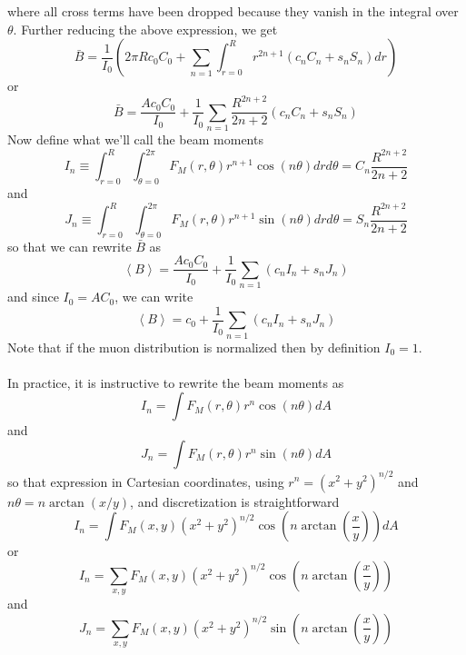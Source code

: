 \documentclass[twoside]{article}
\begin{document}
where all cross terms have been dropped because they vanish in the integral over $\theta$. Further reducing the above expression, we get 
\begin{equation}
\bar{B} = \frac{1}{I_0}(2 \pi R c_0C_0 + \sum_{n=1} \int^R_{r=0} r^{2n + 1}(c_nC_n + s_n S_n ) dr  ) 
\end{equation}
or 
\begin{equation}
\bar{B} = 
\frac{A c_0 C_0}{I_0} + \frac{1}{I_0}\sum_{n=1} \frac{R^{2n + 2}}{2n+2}(c_nC_n + s_n S_n ) 
\end{equation}
Now define what we'll call the beam moments
\begin{equation}
\boxed{
	I_n \equiv \int^{R}_{r = 0}  \int^{2\pi}_{\theta = 0} F_M(r,\theta) r^{n+1} \cos(n\theta) dr d\theta = C_n\frac{R^{2n+2}}{2n + 2}
}
\end{equation}
and
\begin{equation}
\boxed{
	J_n \equiv \int^{R}_{r = 0}  \int^{2\pi}_{\theta = 0} F_M(r,\theta) r^{n+1} \sin(n\theta) dr d\theta = S_n\frac{R^{2n+2}}{2n + 2}
}
\end{equation}
so that we can rewrite $\bar{B}$ as
\begin{equation}
\left\langle B \right\rangle = 
\frac{A c_0 C_0}{I_0} + \frac{1}{I_0}\sum_{n=1}(c_n I_n + s_n J_n ) 
\end{equation}
and since $I_0 = A C_0$, we can write
\begin{equation}
\boxed{
\left\langle B \right\rangle = 
c_0 + \frac{1}{I_0}\sum_{n=1}(c_n I_n + s_n J_n ) 
}
\end{equation}
Note that if the muon distribution is normalized then by definition $I_0 = 1$. \\
\\
In practice, it is instructive to rewrite the beam moments as
\begin{equation}
	I_n = \int F_M(r,\theta) r^{n} \cos(n\theta) dA 
	\end{equation}
and
\begin{equation}
J_n = \int F_M(r,\theta) r^{n} \sin(n\theta) dA 
\end{equation}
so that expression in Cartesian coordinates, using $r^n=(x^2 + y^2)^{n/2}$ and $n \theta = n \arctan(x/y)$, and discretization is straightforward
\begin{equation}
I_n =  \int F_M(x,y) (x^2 + y^2)^{n/2} \cos(n  \arctan(\frac{x}{y})) dA 
\end{equation}
or 
\begin{equation}
\boxed{
I_n =  \sum_{x,y} F_M(x,y) (x^2 + y^2)^{n/2} \cos(n  \arctan(\frac{x}{y}))
}
\end{equation}
and
\begin{equation}
\boxed{
	J_n =  \sum_{x,y} F_M(x,y) (x^2 + y^2)^{n/2} \sin(n  \arctan(\frac{x}{y}))
}
\end{equation}
\end{document}
